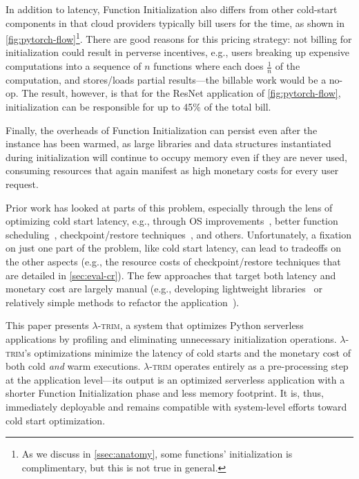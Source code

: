 \documentclass[sigplan,screen]{acmart}
\newcommand{\sys}{\textsc{\ensuremath{\lambda}-trim}\xspace}
\begin{document}
In addition to latency, Function Initialization also differs from other cold-start components in that cloud providers typically bill users for the time, as shown in \cref{fig:pytorch-flow}\footnote{As we discuss in \cref{ssec:anatomy}, some functions' initialization is complimentary, but this is not true in general.}.
There are good reasons for this pricing strategy: not billing for initialization could result in perverse incentives, e.g., users breaking up expensive computations into a sequence of $n$ functions where each does $\frac{1}{n}$ of the computation, and stores/loads partial results---the billable work would be a no-op.
The result, however, is that for the ResNet application of \cref{fig:pytorch-flow}, initialization can be responsible for up to 45\% of the total bill.

Finally, the overheads of Function Initialization can persist even after the instance has been warmed, as large libraries and data structures instantiated during initialization will continue to occupy memory even if they are never used, consuming resources that again manifest as high monetary costs for every user request.

Prior work has looked at parts of this problem, especially through the lens of optimizing cold start latency, e.g., through OS improvements~\cite{firecracker2020, catalyzer2020, faasnap2022}, better function scheduling~\cite{caerus2021, LCS2023, wild2020, sustainableServerless24,kraken2021}, checkpoint/restore techniques~\cite{catalyzer2020, prebaking2020}, and others.
Unfortunately, a fixation on just one part of the problem, like cold start latency, can lead to tradeoffs on the other aspects (e.g., the resource costs of checkpoint/restore techniques that are detailed in \cref{sec:eval-cr}).
The few approaches that target both latency and monetary cost are largely manual (e.g., developing lightweight libraries~\cite{libprof2024} or relatively simple methods to refactor the application~\cite{faaslight2023, serverless-app-dev2021, fusion2023}).



This paper presents \sys, a system that optimizes Python serverless applications by profiling and eliminating unnecessary initialization operations.
\sys's optimizations minimize the latency of cold starts and the monetary cost of both cold \textit{and} warm executions.
\sys operates entirely as a pre-processing step at the application level---its output is an optimized serverless application with a shorter Function Initialization phase and less memory footprint.
It is, thus, immediately deployable and remains compatible with system-level efforts toward cold start optimization.
\end{document}
